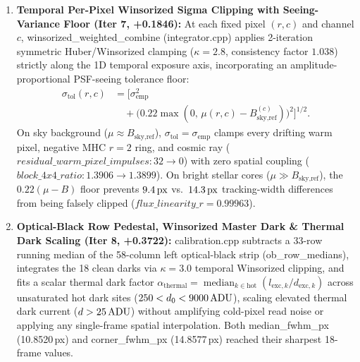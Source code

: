 \documentclass[10pt,twocolumn,letterpaper]{article}
\DeclareRobustCommand{\code}[1]{\texttt{#1}}
\def\code#1{#1}%
\def\allowbreak{}%
\begin{document}
\begin{enumerate}
  \item \textbf{Temporal Per-Pixel Winsorized Sigma Clipping with Seeing-Variance Floor (\code{Iter 7}, \code{+0.1846}):}
  At each fixed pixel $(r, c)$ and channel $c$, \code{winsorized\_\allowbreak weighted\_\allowbreak combine} (\code{integrator.cpp}) applies 2-iteration symmetric Huber/Winsorized clamping ($\kappa = 2.8$, consistency factor $1.038$) strictly along the 1D temporal exposure axis, incorporating an amplitude-proportional PSF-seeing tolerance floor:
  \begin{equation}
    \begin{aligned}
      \sigma_{\text{tol}}(r, c) &= \Big[\sigma_{\text{emp}}^2 \\
      &\quad + \big(0.22 \max(0,\, \mu(r,c) - B_{\text{sky,ref}}^{(c)})\big)^2\Big]^{1/2}.
    \end{aligned}
    \label{eq:seeing_floor}
  \end{equation}
  On sky background ($\mu \approx B_{\text{sky,ref}}$), $\sigma_{\text{tol}} = \sigma_{\text{emp}}$ clamps every drifting warm pixel, negative MHC $r=2$ ring, and cosmic ray ($\code{residual\_warm\_pixel\_impulses}: \code{32} \to \code{0}$) with zero spatial coupling ($\code{block\_4x4\_ratio}: \code{1.3906} \to \code{1.3899}$). On bright stellar cores ($\mu \gg B_{\text{sky,ref}}$), the $0.22(\mu - B)$ floor prevents $9.4\text{\,px}$ vs.\ $14.3\text{\,px}$ tracking-width differences from being falsely clipped ($\code{flux\_linearity\_r} = \code{0.99963}$).

  \item \textbf{Optical-Black Row Pedestal, Winsorized Master Dark \& Thermal Dark Scaling (\code{Iter 8}, \code{+0.3722}):}
  \code{calibration.cpp} subtracts a 33-row running median of the 58-column left optical-black strip (\code{ob\_row\_medians}), integrates the 18 clean darks via $\kappa = 3.0$ temporal Winsorized clipping, and fits a scalar thermal dark factor $\alpha_{\text{thermal}} = \operatorname{median}_{k \in \text{hot}}(l_{\text{exc},k}/d_{\text{exc},k})$ across unsaturated hot dark sites ($250 < d_0 < 9000\text{\,ADU}$), scaling elevated thermal dark current ($d > 25\text{\,ADU}$) without amplifying cold-pixel read noise or applying any single-frame spatial interpolation. Both \code{median\_fwhm\_px} (\code{10.8520\,px}) and \code{corner\_fwhm\_px} (\code{14.8577\,px}) reached their sharpest 18-frame values.


\end{enumerate}
\end{document}
